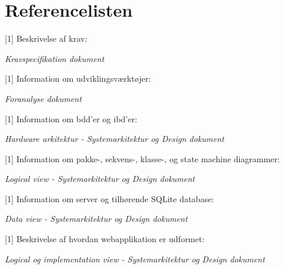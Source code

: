 \chapter{Referencelisten}

\vspace{-0.5cm}


[1] Beskrivelse af krav:
\vspace{-0.3cm}

\qquad \textit{Kravspecifikation dokument} \\
\vspace{-0.3cm}



[1] Information om udviklingsværktøjer:
\vspace{-0.3cm}

\qquad \textit{Foranalyse dokument} \\
\vspace{-0.3cm}



[1] Information om bdd'er og ibd'er:
\vspace{-0.3cm}

\qquad \textit{Hardware arkitektur - Systemarkitektur og Design dokument} \\
\vspace{-0.3cm}



[1] Information om pakke-, sekvens-, klasse-, og state machine diagrammer:
\vspace{-0.3cm}

\qquad \textit{Logical view - Systemarkitektur og Design dokument} \\
\vspace{-0.3cm}



[1] Information om server og tilhørende SQLite database:
\vspace{-0.3cm}

\qquad \textit{Data view - Systemarkitektur og Design dokument} \\
\vspace{-0.3cm}



[1] Beskrivelse af hvordan webapplikation er udformet:
\vspace{-0.3cm}

\qquad \textit{Logical og implementation view - Systemarkitektur og Design dokument} \\
\vspace{-0.3cm}



